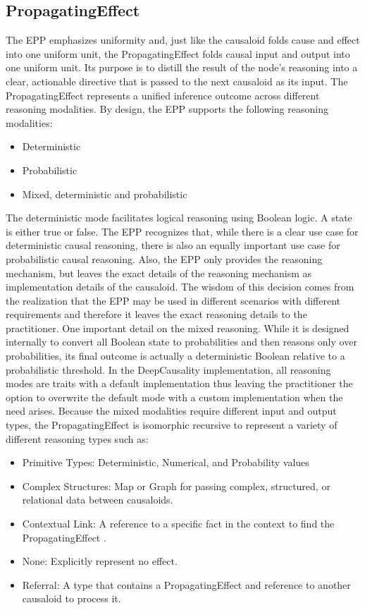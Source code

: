 %
%
\subsection{PropagatingEffect}
\label{sec:propagating_effect}

The EPP emphasizes uniformity and, just like the causaloid folds cause and effect into one uniform unit, the PropagatingEffect folds causal input and output into one uniform unit. Its purpose is to distill the result of the node's reasoning into a clear, actionable directive that is passed to the next causaloid as its input. The PropagatingEffect represents a unified inference outcome across different reasoning modalities. By design, the EPP supports the following reasoning modalities:

\begin{itemize}	
	\item Deterministic
	\item Probabilistic 
	\item Mixed, deterministic and probabilistic 
\end{itemize}

The deterministic mode facilitates logical reasoning using Boolean logic. A state is either true or false. The EPP recognizes that, while there is a clear use case for deterministic causal reasoning, there is also an equally important use case for probabilistic causal reasoning. Also, the EPP only provides the reasoning mechanism, but leaves the exact details of the reasoning mechanism as implementation details of the causaloid. The wisdom of this decision comes from the realization that the EPP may be used in different scenarios with different requirements and therefore it leaves the exact reasoning details to the practitioner. One important detail on the mixed reasoning. While it is designed internally to convert all Boolean state to probabilities and then reasons only over  probabilities, its final outcome is actually a deterministic Boolean relative to a probabilistic threshold. In the DeepCausality implementation, all reasoning modes are traits with a default implementation thus leaving the practitioner the option to overwrite the default mode with a custom implementation when the need arises. Because the mixed modalities require different input and output types, the PropagatingEffect is isomorphic recursive to represent a variety of different reasoning types such as:

\begin{itemize}	
	\item Primitive Types: Deterministic, Numerical, and Probability values
	\item Complex Structures: Map or Graph for passing complex, structured, or relational data between causaloids.
	\item Contextual Link: A reference to a specific fact in the context to find the PropagatingEffect . 
	\item None: Explicitly represent no effect.
	\item Referral: A type that contains a PropagatingEffect and reference to another causaloid to process it.
\end{itemize}

